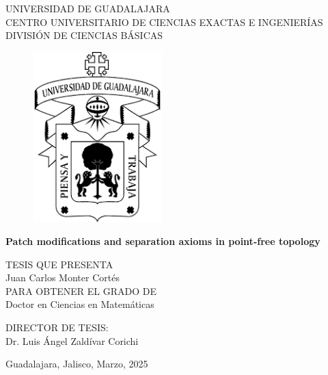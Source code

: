 \documentclass[letterpaper,12pt,oneside]{book}
\begin{document}
\begin{titlepage}
	
	\vspace*{2cm} 
		\begin{center}
			UNIVERSIDAD DE GUADALAJARA\\
			CENTRO UNIVERSITARIO DE CIENCIAS EXACTAS E INGENIERÍAS\\
			DIVISIÓN DE CIENCIAS BÁSICAS
		\end{center}
		\begin{figure}[htp]
			\centering
			\includegraphics*[width=5cm]{LogoUdg1.png}
		\end{figure}
		\begin{center}
			\textbf{Patch modifications and separation axioms in point-free topology}
		\end{center}
		\begin{center}
			TESIS QUE PRESENTA\\
			Juan Carlos Monter Cortés\\
			PARA OBTENER EL GRADO DE \\
			Doctor en Ciencias en Matemáticas
		\end{center}
		\vspace*{0.5cm}
		\begin{center}
			DIRECTOR DE TESIS:\\
			Dr. Luis Ángel Zaldívar Corichi\\
		\end{center}
		\begin{flushright}
			\vfill
		Guadalajara, Jalisco, Marzo, 2025\par
		\end{flushright}
\end{titlepage}

\newpage
$\ $
\thispagestyle{empty} %

\newpage
$\ $
\thispagestyle{empty} %
\end{document}
